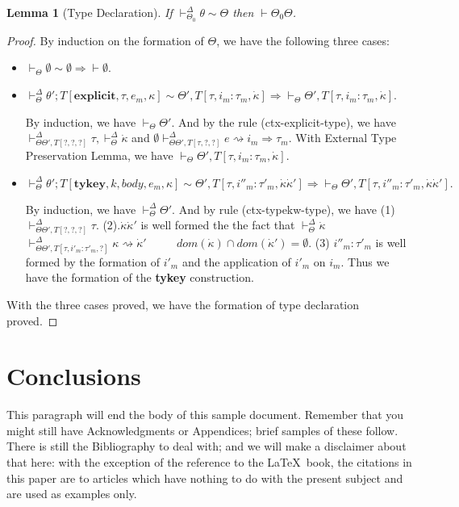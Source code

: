 \documentclass{sig-alternate}
\newcommand{\myvdash}{\vdash_{\Theta}^{\Delta}}
\newtheorem{lemma}{Lemma}
\begin{document}
\begin{lemma}[Type Declaration]
If $\vdash_{\Theta_0}^{\Delta}\theta\sim\Theta$ then $\vdash\Theta_0\Theta$.
\end{lemma}
\begin{proof}
By induction on the formation of $\Theta$, we have the following three cases:
\begin{itemize}
\item $\vdash_{\Theta}\emptyset\sim\emptyset \Longrightarrow \vdash{\emptyset}$.
\item ${\vdash^{\Delta}_{\Theta}} \theta';T[\mathbf{explicit},\tau,e_m,\kappa] \sim \Theta',T[\tau,i_m:\tau_m,\dot\kappa] \Longrightarrow \vdash_{\Theta}\Theta',T[\tau,i_m:\tau_m,\dot{\kappa}]$. 

By induction, we have $\vdash_{\Theta}\Theta'$. And by the rule (ctx-explicit-type), we have $\vdash_{\Theta\Theta',T[?,?,?]}^{\Delta}\tau, \myvdash\dot\kappa$ and $\emptyset\vdash_{\Theta\Theta',T[\tau,?,?]}^{\Delta}e\rightsquigarrow i_m\Rightarrow\tau_m$. With External Type Preservation Lemma, we have $\vdash_{\Theta}\Theta',T[\tau,i_m:\tau_m,\dot{\kappa}]$.
\item $\myvdash \theta';T[\mathbf{tykey},k,body,e_m,\kappa] \sim \Theta',T[\tau,i''_m:\tau'_m,\dot{\kappa}\dot{\kappa}'] \Longrightarrow \vdash_{\Theta}\Theta',T[\tau,i''_m:\tau'_m,\dot{\kappa}\dot{\kappa}'].$

By induction, we have $\myvdash\Theta'$. And by rule (ctx-typekw-type), we have (1) $\vdash_{\Theta\Theta',T[?,?,?]}^{\Delta}\tau$. (2).$\dot\kappa\dot\kappa'$ is well formed the the fact that $\myvdash \dot\kappa$~~~~ $\vdash^{\Delta}_{\Theta\Theta',T[\tau,i'_m:\tau'_m,?]}\kappa\rightsquigarrow\dot{\kappa}'$ ~~~~ $dom(\dot{\kappa})\cap dom(\dot{\kappa}')=\emptyset$. (3) $i''_m:\tau'_m$ is well formed by the formation of $i'_m$ and the application of $i'_m$ on $i_m$. Thus we have the formation of the \textbf{tykey} construction.
\end{itemize}
With the three cases proved, we have the formation of type declaration proved.
\end{proof}


%


\section{Conclusions}
This paragraph will end the body of this sample document.
Remember that you might still have Acknowledgments or
Appendices; brief samples of these
follow.  There is still the Bibliography to deal with; and
we will make a disclaimer about that here: with the exception
of the reference to the \LaTeX\ book, the citations in
this paper are to articles which have nothing to
do with the present subject and are used as
examples only.
\end{document}
